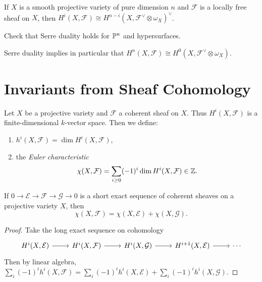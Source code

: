 \begin{theorem}
  If $X$ is a smooth projective
  variety of pure dimension $n$ and
  $\mathcal{F}$ is a locally free sheaf on
  $X$, then
  $H^i(X, \mathcal{F}) \cong H^{n - i}(X, \mathcal{F}^\vee \otimes \omega_X)^\vee$.
\end{theorem}

\begin{exercise}
  Check that Serre duality
  holds for $\mathbb{P}^n$ and hypersurfaces.
\end{exercise}

\begin{remark}
  Serre duality implies in particular that
  $H^n(X, \mathcal{F}) \cong H^0(X, \mathcal{F}^\vee \otimes \omega_X)$.
\end{remark}

\section{Invariants from Sheaf Cohomology}

\begin{definition}
  Let $X$ be a projective variety and
  $\mathcal{F}$ a coherent sheaf on $X$.
  Thus $H^i(X, \mathcal{F})$ is
  a finite-dimensional $k$-vector space.
  Then we define:
  \begin{enumerate}
    \item $h^i(X, \mathcal{F}) = \dim H^i(X, \mathcal{F})$,
    \item the \emph{Euler characteristic}
      \[
        \chi(X, \mathcal{F})
        = \sum_{i \ge 0} (-1)^i \dim H^i(X, \mathcal{F})
        \in \mathbb{Z}.
      \]
  \end{enumerate}
\end{definition}

\begin{lemma}
  If $0 \longrightarrow \mathcal{E} \longrightarrow \mathcal{F} \longrightarrow \mathcal{G} \longrightarrow 0$ is a short exact sequence of coherent sheaves
  on a projective variety $X$, then 
  \[
    \chi(X, \mathcal{F})
    = \chi(X, \mathcal{E}) + \chi(X, \mathcal{G}).
  \]
\end{lemma}

\begin{proof}
  Take the long exact sequence on cohomology
  \[
    \begin{tikzcd}
      H^i(X, \mathcal{E}) \ar[r] & H^i(X, \mathcal{F}) \ar[r] & H^i(X, \mathcal{G}) \ar[r] & H^{i + 1}(X, \mathcal{E})
      \ar[r] & \cdots
    \end{tikzcd}
  \]
  Then by linear algebra,
  $\sum_i (-1)^i h^i(X, \mathcal{F}) = \sum_i (-1)^i h^i(X, \mathcal{E}) + \sum_i (-1)^i h^i(X, \mathcal{G})$.
\end{proof}

